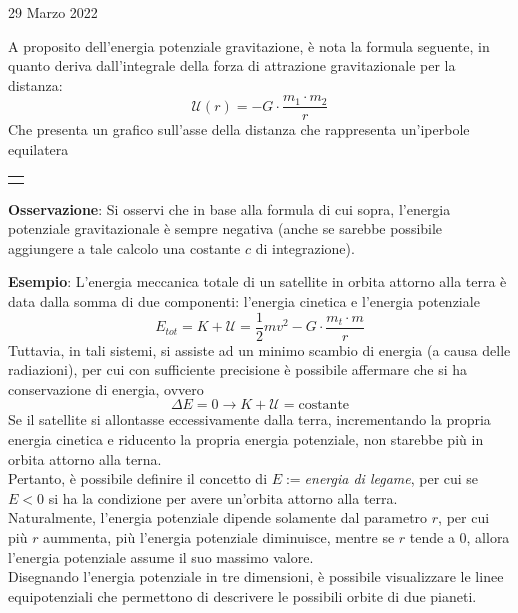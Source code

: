 \documentclass[a4paper]{extarticle}
\begin{document}
\newpage
\noindent
\begin{center}
  29 Marzo 2022
\end{center}
A proposito dell'energia potenziale gravitazione, è nota la formula seguente, in quanto deriva dall'integrale della forza di attrazione gravitazionale per la distanza:
\[\boxed{\mathcal{U}(r) = - G \cdot \frac{m_1 \cdot m_2}{r}}\]
Che presenta un grafico sull'asse della distanza che rappresenta un'iperbole equilatera

\vspace{2em}
\noindent
{}
\begin{tabularx}{\textwidth}{P}
  {
      \centering
  }
\end{tabularx}

\vspace{1em}
\noindent
\textbf{Osservazione}: Si osservi che in base alla formula di cui sopra, l'energia potenziale gravitazionale è sempre negativa (anche se sarebbe possibile aggiungere a tale calcolo una costante $c$ di integrazione).

\vspace{1em}
\noindent
\textbf{Esempio}: L'energia meccanica totale di un satellite in orbita attorno alla terra è data dalla somma di due componenti: l'energia cinetica e l'energia potenziale
\[E_{tot} = K+\mathcal{U}=\frac{1}{2}mv^2 - G \cdot \frac{m_t \cdot m}{r}\]
Tuttavia, in tali sistemi, si assiste ad un minimo scambio di energia (a causa delle radiazioni), per cui con sufficiente precisione è possibile affermare che si ha conservazione di energia, ovvero
\[\Delta E = 0 \longrightarrow K+\mathcal{U}=\text{costante}\]
Se il satellite si allontasse eccessivamente dalla terra, incrementando la propria energia cinetica e riducento la propria energia potenziale, non starebbe più in orbita attorno alla terna.\\
Pertanto, è possibile definire il concetto di \emph{$E:=$energia di legame}, per cui se $E < 0$ si ha la condizione per avere un'orbita attorno alla terra.\\
Naturalmente, l'energia potenziale dipende solamente dal parametro $r$, per cui più $r$ aummenta, più l'energia potenziale diminuisce, mentre se $r$ tende a $0$, allora l'energia potenziale assume il suo massimo valore.\\
Disegnando l'energia potenziale in tre dimensioni, è possibile visualizzare le linee equipotenziali che permettono di descrivere le possibili orbite di due pianeti.
\end{document}
